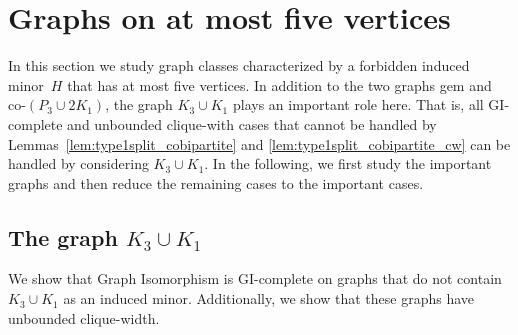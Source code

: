 \documentclass[envcountsame,envcountsect,11pt,a4paper]{llncs}
\begin{document}
\section{Graphs on at most five vertices}
\label{sec:complicated}

In this section we study graph classes characterized by a forbidden induced minor~$H$ that has at most five vertices. 
In addition to the two graphs gem and co-$(P_{3} \cup 2 K_{1})$,
the graph $K_3 \cup K_1$ plays an important role here.
That is, all GI-complete and unbounded clique-with cases that cannot be handled by 
Lemmas~\ref{lem:type1split_cobipartite} and \ref{lem:type1split_cobipartite_cw}
can be handled by considering $K_3 \cup K_1$.
In the following, we first study the important graphs and then
reduce the remaining cases to the important cases.


\subsection{The graph $K_3 \cup K_1$}
We show that {\sc Graph Isomorphism} is GI-complete on graphs that do not contain $K_3 \cup K_1$ as an induced minor. Additionally, we show that these graphs have unbounded clique-width.
\end{document}
